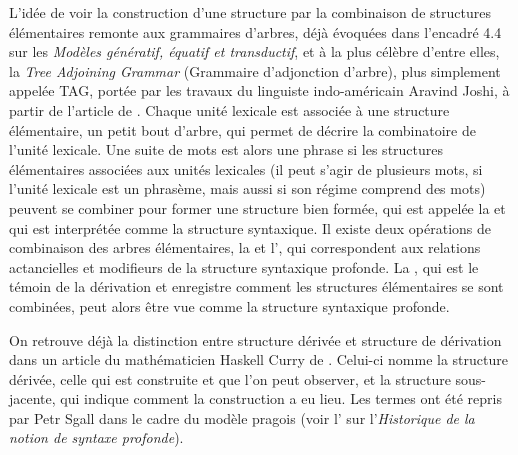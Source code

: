 {L’idée de voir la construction d’une structure par la combinaison de structures élémentaires remonte aux grammaires d’arbres, déjà évoquées dans l’encadré 4.4 sur les \textit{Modèles génératif, équatif et transductif}, et à la plus célèbre d’entre elles, la \textit{Tree Adjoining Grammar} (Grammaire d’adjonction d’arbre), plus simplement appelée TAG, portée par les travaux du linguiste indo-américain Aravind Joshi, à partir de l’article de \citeyear{joshi1975tree}. Chaque unité lexicale est associée à une structure élémentaire, un petit bout d’arbre, qui permet de décrire la combinatoire de l’unité lexicale. Une suite de mots est alors une phrase si les structures élémentaires associées aux unités lexicales (il peut s’agir de plusieurs mots, si l’unité lexicale est un phrasème, mais aussi si son régime comprend des mots) peuvent se combiner pour former une structure bien formée, qui est appelée la  et qui est interprétée comme la structure syntaxique.  Il existe deux opérations de combinaison des arbres élémentaires, la  et l’, qui correspondent aux relations actancielles et modifieurs de la structure syntaxique profonde. La , qui est le témoin de la dérivation et enregistre comment les structures élémentaires se sont combinées, peut alors être vue comme la structure syntaxique profonde. 

On retrouve déjà la distinction entre structure dérivée et structure de dérivation dans un article du mathématicien Haskell Curry de \citeyear{curry1961some}. Celui-ci nomme  la structure dérivée, celle qui est construite et que l’on peut observer, et  la structure sous-jacente, qui indique comment la construction a eu lieu. Les termes ont été repris par Petr Sgall dans le cadre du modèle pragois (voir l’ sur l’\textit{Historique de la notion de syntaxe profonde}).

}
